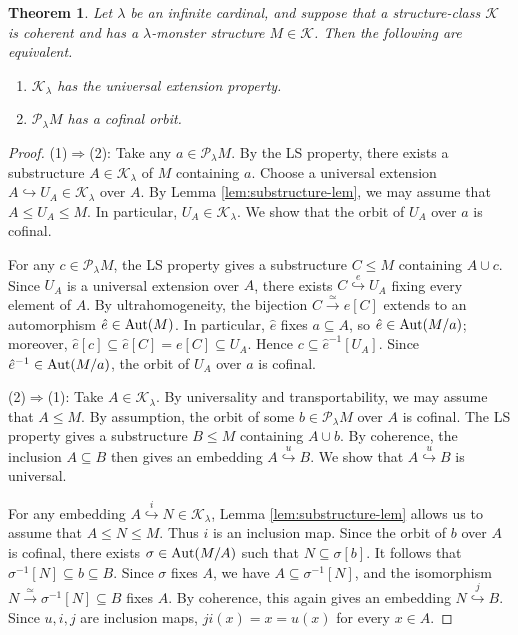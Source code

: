 \documentclass[10pt]{amsart}
\numberwithin{equation}{section}
\theoremstyle{plain}
\newtheorem{theorem}{Theorem}[section]
\theoremstyle{definition}
\newcommand{\K}{\mathcal{K}}
\newcommand{\embed}{\hookrightarrow}
\newcommand{\edge}[1]{\overset{#1}{\longrightarrow}}
\newcommand{\embedge}[1]{\overset{#1}{\embed}}
\begin{document}
\begin{theorem}\label{thm:cofinal-orbit}
Let $\lambda$ be an infinite cardinal, and suppose that a structure-class $\K$ is coherent and has a $\lambda$-monster structure $M\in\K$.
Then the following are equivalent.
\begin{enumerate}
\item $\K_\lambda$ has the universal extension property.
\item $\mathcal{P}_\lambda M$ has a cofinal orbit.
\end{enumerate}
\end{theorem}

\begin{proof}
(1)$\Rightarrow$(2):
Take any $a\in \mathcal{P}_\lambda M$.
By the LS property, there exists a substructure $A\in\K_\lambda$ of $M$ containing $a$.
Choose a universal extension $A\embed U_A\in\K_\lambda$ over $A$.
By Lemma \ref{lem:substructure-lem}, we may assume that $A\leq U_A\leq M$.
In particular, $U_A\in\K_\lambda$.
We show that the orbit of $U_A$ over $a$ is cofinal.

For any $c\in \mathcal{P}_\lambda M$, the LS property gives a substructure $C\leq M$ containing $A\cup c$.
Since $U_A$ is a universal extension over $A$, there exists $C\embedge{e}U_A$ fixing every element of $A$.
By ultrahomogeneity, the bijection $C\edge{\simeq}e[C]$ extends to an automorphism $\hat{e}\in{\rm Aut}(M)$.
In particular, $\hat{e}$ fixes $a\subseteq A$, so $\hat{e}\in {\rm Aut}(M/a)$; moreover, $\hat{e}[c]\subseteq \hat{e}[C]=e[C]\subseteq U_A$.
Hence $c\subseteq\hat{e}^{-1}[U_A]$.
Since $\hat{e}^{-1}\in{\rm Aut}(M/a)$, the orbit of $U_A$ over $a$ is cofinal.

(2)$\Rightarrow$(1):
Take $A\in\K_\lambda$.
By universality and transportability, we may assume that $A\leq M$.
By assumption, the orbit of some $b\in \mathcal{P}_\lambda M$ over $A$ is cofinal.
The LS property gives a substructure $B\leq M$ containing $A\cup b$.
By coherence, the inclusion $A\subseteq B$ then gives an embedding $A\embedge{u}B$.
We show that $A\embedge{u}B$ is universal.

For any embedding $A\embedge{i} N\in\K_\lambda$, Lemma \ref{lem:substructure-lem} allows us to assume that $A\leq N\leq M$.
Thus $i$ is an inclusion map.
Since the orbit of $b$ over $A$ is cofinal, there exists $\sigma\in {\rm Aut}(M/A)$ such that $N\subseteq \sigma[b]$.
It follows that $\sigma^{-1}[N]\subseteq b\subseteq B$.
Since $\sigma$ fixes $A$, we have $A\subseteq \sigma^{-1}[N]$, and the isomorphism $N\edge{\simeq}\sigma^{-1}[N]\subseteq B$ fixes $A$.
By coherence, this again gives an embedding $N\embedge{j} B$.
Since $u,i,j$ are inclusion maps, $ji(x)=x=u(x)$ for every $x\in A$.
\end{proof}
\end{document}
